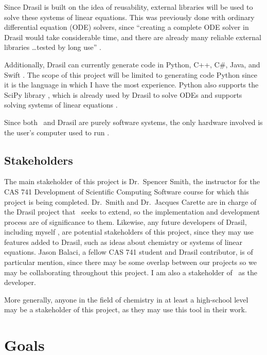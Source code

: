 \documentclass{article}
\begin{document}
Since Drasil is built on the idea of reusability, external libraries will be
used to solve these systems of linear equations. This was previously done with
ordinary differential equation (ODE) solvers, since ``creating a complete ODE
solver in Drasil would take considerable time, and there are already many
reliable external libraries \dots tested by long use''
\cite[p. 24]{chen_solving_2022}.

Additionally, Drasil can currently generate code in Python, C++, C\#, Java, and
Swift \cite{chen_solving_2022}. The scope of this project will be limited to 
generating code Python since it is the language in which I 
have the most experience. Python also supports the SciPy library
\cite{2020SciPy-NMeth}, which is already used by Drasil to solve ODEs
\cite{chen_solving_2022} and supports solving systems of linear equations \cite{the_scipy_community_scipylinalgsolve_2023}.

Since both \progname~and Drasil are purely software systems, the only
hardware involved is the user's computer used to run \progname.

\subsection{Stakeholders} \label{stkhlds}
The main stakeholder of this project is Dr.~Spencer Smith, the instructor for
the CAS 741 Development of Scientific Computing Software course for which this
project is being completed. Dr.~Smith and Dr.~Jacques Carette are in charge of
the Drasil project that \progname~seeks to extend, so the implementation and
development process are of significance to them. Likewise, any future
developers of Drasil, including myself , are
potential stakeholders of this project, since they may use features added to
Drasil, such as ideas about chemistry or systems of linear equations. Jason
Balaci, a fellow CAS 741 student and Drasil contributor, is of particular 
mention, since
there may be some overlap between our projects so we may be collaborating
throughout this project. I am also a stakeholder of \progname~as the
developer.

More generally, anyone in the field of chemistry in at least a high-school level
may be a stakeholder of this project, as they may use this tool in their work.

\section{Goals}
\end{document}
